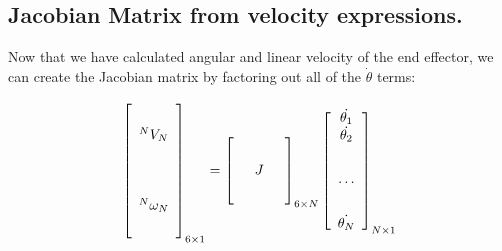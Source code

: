 \subsection{Jacobian Matrix from velocity expressions.}

Now that we have calculated angular and linear velocity of the end effector, we can create the Jacobian matrix by factoring out all of the $\dot{\theta}$ terms:

\[
\left[
\begin{array}{c}
\vspace{0.1in} \\ ^NV_N \\ \vspace{0.1in} \\\vspace{0.1in} \\ ^N\omega_N \\ \vspace{0.1in}\\
\end{array} \right ]_{6\times 1}
=
\left [
\begin{array}{ccc}
\vspace{0.1in} & & \\
& J & \\
\vspace{0.1in}& & \\
\end{array}\right]_{6\times N}
\left[
\begin{array}{c}
 \dot{\theta_1}   \\   \dot{\theta_2}  \\ \vspace{0.1in}\\ \dots \\ \vspace{0.1in} \\  \dot{\theta_N}
\end{array}
\right]_{N\times 1}
\]

